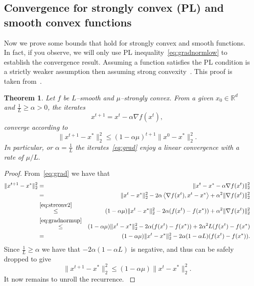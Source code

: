 \documentclass[11pt]{article}
\newcommand{\R}{\mathbb{R}}
\newcommand{\qed}{\nobreak \ifvmode \relax \else
      \ifdim\lastskip<1.5em \hskip-\lastskip
      \hskip1.5em plus0em minus0.5em \fi \nobreak
      \vrule height0.75em width0.5em depth0.25em\fi}
\newcommand{\norm}[1]{\lVert#1\rVert}
\newcommand{\dotprod}[1]{\left< #1\right>}
\newtheorem{theorem}{Theorem}[section]
\begin{document}
\subsection{Convergence for strongly convex (PL) and smooth convex functions}
Now we prove some bounds that hold for strongly convex and smooth functions. In fact, if you observe, we will only use PL inequality~\eqref{eq:gradnormlow} to establish the convergence result. Assuming a function satisfies the PL condition is a strictly weaker assumption then assuming strong convexity~\cite{KarimiNS16}. This proof is taken from~\cite{KarimiNS16}.

\begin{theorem}\label{theo:gradstrconv}
Let $f$ be $L$--smooth and $\mu$--strongly convex.
From a given $x_0 \in \R^d$ and $\tfrac{1}{L} \geq \alpha>0$, the iterates
\begin{equation}\label{eq:grad} x^{t+1}=x^t - \alpha \nabla f(x^t),\end{equation}
converge according to
\begin{equation}
\norm{x^{t+1}-x^*}_2^2 \leq (1-\alpha \mu)^{t+1} \norm{x^0 -x^*}_2^2.
\end{equation}
In particular, or $\alpha = \tfrac{1}{L}$ the iterates~\eqref{eq:grad} enjoy a linear convergence with a rate of $\mu/L.$
\end{theorem}
\begin{proof}
From~\eqref{eq:grad} we  have that
\begin{eqnarray}
\norm{x^{t+1}-x^*}_2^2 & =& \norm{x^{t}-x^*- \alpha \nabla f(x^t)}_2^2 \nonumber\\
& =& \norm{x^{t}-x^*}_2^2 - 2\alpha \dotprod{\nabla f(x^t),x^t-x^*} + \alpha^2 \norm{\nabla f(x^t)}_2^2 \nonumber \\
& \overset{\eqref{eq:strconv2}}{\leq} &(1-\alpha \mu)\norm{x^{t}-x^*}_2^2 - 2\alpha (f(x^t) -f(x^*)) + \alpha^2 \norm{\nabla f(x^t)}_2^2 \nonumber \\
& \overset{\eqref{eq:gradnormup}}{\leq} & (1-\alpha \mu)\norm{x^{t}-x^*}_2^2 - 2\alpha (f(x^t) -f(x^*)) + 2\alpha^2 L (f(x^t) -f(x^*)\nonumber \\
& =& (1-\alpha \mu)\norm{x^{t}-x^*}_2^2 - 2\alpha(1-\alpha L) (f(x^t) -f(x^*)).
\end{eqnarray}
Since $\tfrac{1}{L} \geq \alpha$ we have that $- 2\alpha(1-\alpha L) $  is negative, and thus can be safely dropped to give
\[\norm{x^{t+1}-x^*}_2^2  \leq (1-\alpha \mu)\norm{x^{t}-x^*}_2^2. \]
It now remains to unroll the recurrence.\hfill \qed
\end{proof}
\end{document}
